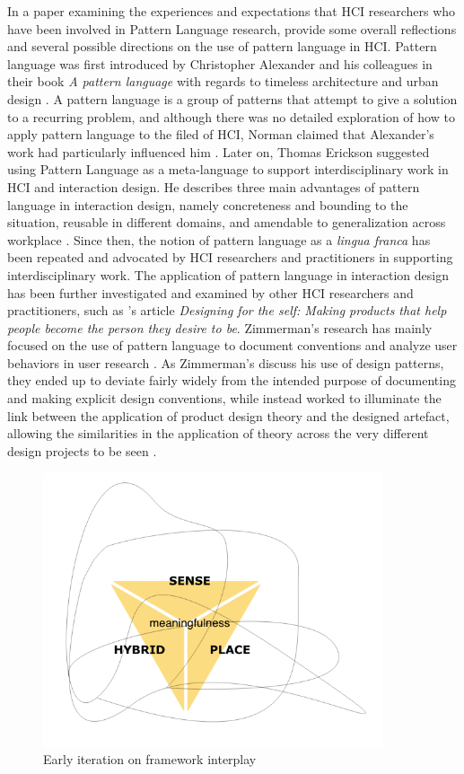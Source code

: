 In a paper examining the experiences and expectations that HCI researchers who have been involved in Pattern Language research, \autocite{pan_pattern_2013} provide some overall reflections and several possible directions on the use of pattern language in HCI. Pattern language was first introduced by Christopher Alexander and his colleagues in their book \emph{A pattern language} with regards to timeless architecture and urban design \autocite{pattern_language_1977}. A pattern language is a group of patterns that attempt to give a solution to a recurring problem, and although there was no detailed exploration of how to apply pattern language to the filed of HCI, Norman claimed that Alexander’s work had particularly influenced him \autocite[p. 1990]{pan_pattern_2013}. Later on, Thomas Erickson suggested using Pattern Language as a meta-language to support interdisciplinary work in HCI and interaction design. He describes three main advantages of pattern language in interaction design, namely concreteness and bounding to the situation, reusable in different domains, and amendable to generalization across workplace \autocite[p. 1991]{pan_pattern_2013}. Since then, the notion of pattern language as a \emph{lingua franca} has been repeated and advocated by HCI researchers and practitioners in supporting interdisciplinary work. The application of pattern language in interaction design has been further investigated and examined by other HCI researchers and practitioners, such as \autocite{zimmerman_designing_2009}'s article \textit{Designing for the self: Making products that help people become the person they desire to be}. Zimmerman's research has mainly focused on the use of pattern language to document conventions and analyze user behaviors in user research \autocite[p. 1991]{pan_pattern_2013}. As Zimmerman's discuss his use of design patterns, they ended up to deviate fairly widely from the intended purpose of documenting and making explicit design conventions, while instead worked to illuminate the link between the application of product design theory and the designed artefact, allowing the similarities in the application of theory across the very different design projects to be seen \autocite[p. 402]{zimmerman_designing_2009}.

\begin{figure}[H]
\centering 
\includegraphics[width=10cm]{pictures/Theory/framework_early.png}
\caption{Early iteration on framework interplay}
\end{figure}


